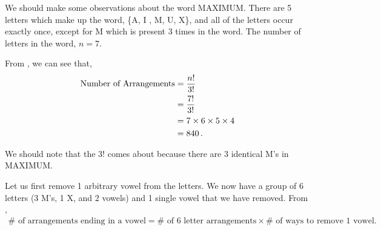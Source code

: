 %
%


\begin{subquestions}
	
\subquestion

We should make some observations about the word MAXIMUM. There are 5 letters which make up the word, \{A, I , M, U, X\}, and all of the letters occur exactly once, except for M which is present 3 times in the word. The number of letters in the word, $n=7$.
	
\begin{subsubquestions}
	
\subsubquestion

From , we can see that,
\begin{align}
	\text{Number of Arrangements} & = \frac{n!}{3!} \nonumber \\
	                              & = \frac{7!}{3!} \nonumber \\
	                              & = 7 \times 6 \times 5 \times 4 \nonumber \\
	                              & = 840 \,.
\end{align}	
	
We should note that the $3!$ comes about because there are 3 identical M's in MAXIMUM.


\subsubquestion

Let us first remove 1 arbitrary vowel from the letters.
We now have a group of 6 letters (3 M's, 1 X, and 2 vowels) and 1 single vowel that we have removed. From ,
\begin{align}
	\text{$\#$ of arrangements ending in a vowel} = \text{$\#$ of 6 letter arrangements} \times \text{$\#$ of ways to remove 1 vowel}. \label{2011:q3:NoVowel}
\end{align}


\end{subsubquestions}
\end{subquestions}
